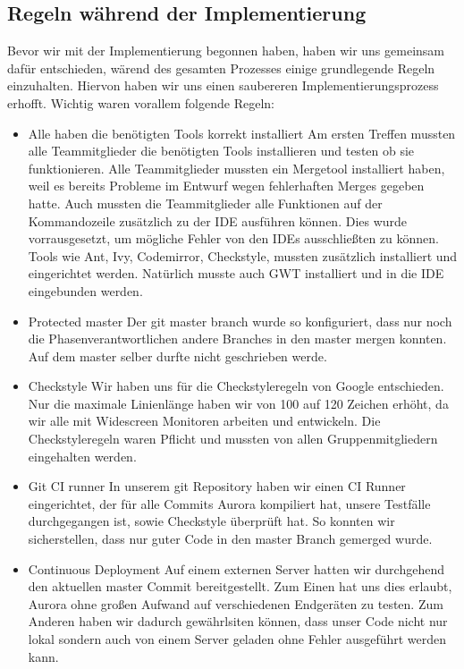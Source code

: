 \documentclass[parskip=full,11pt,twoside]{scrartcl}
\begin{document}
\subsection{Regeln während der Implementierung}
Bevor wir mit der Implementierung begonnen haben, haben wir uns gemeinsam dafür entschieden, wärend des gesamten Prozesses einige grundlegende Regeln einzuhalten.
Hiervon haben wir uns einen saubereren Implementierungsprozess erhofft.
Wichtig waren vorallem folgende Regeln:
\begin{itemize}
	\item Alle haben die benötigten Tools korrekt installiert
	\newline
	Am ersten Treffen mussten alle Teammitglieder die benötigten Tools installieren und testen ob sie funktionieren.
	Alle Teammitglieder mussten ein Mergetool installiert haben, weil es bereits Probleme im Entwurf wegen fehlerhaften Merges gegeben hatte.
	Auch mussten die Teammitglieder alle Funktionen auf der Kommandozeile zusätzlich 	zu der IDE ausführen können. Dies wurde vorrausgesetzt, um mögliche Fehler von den IDEs ausschließten zu können.
	Tools wie Ant, Ivy, Codemirror, Checkstyle, mussten zusätzlich installiert und eingerichtet werden.
	Natürlich musste auch GWT installiert und in die IDE eingebunden werden.

    \item Protected master
        \newline
        Der git master branch wurde so konfiguriert, dass nur noch die Phasenverantwortlichen andere Branches in den master mergen konnten.
        Auf dem master selber durfte nicht geschrieben werde.
    \item Checkstyle
    \newline
    Wir haben uns für die Checkstyleregeln von Google entschieden. Nur die maximale Linienlänge haben wir von 100 auf 120 Zeichen erhöht, da wir alle mit Widescreen Monitoren arbeiten und entwickeln. Die Checkstyleregeln waren Pflicht und mussten von allen Gruppenmitgliedern eingehalten werden.
    \item Git CI runner
        \newline
        In unserem git Repository haben wir einen CI Runner eingerichtet, der für alle Commits Aurora kompiliert hat, unsere Testfälle durchgegangen ist, sowie Checkstyle überprüft hat.
        So konnten wir sicherstellen, dass nur guter Code in den master Branch gemerged wurde.

    \item Continuous Deployment
        \newline
        Auf einem externen Server hatten wir durchgehend den aktuellen master Commit bereitgestellt.
        Zum Einen hat uns dies erlaubt, Aurora ohne großen Aufwand auf verschiedenen Endgeräten zu testen.
        Zum Anderen haben wir dadurch gewährlsiten können, dass unser Code nicht nur lokal sondern auch von einem Server geladen ohne Fehler ausgeführt werden kann.


\end{itemize}
\end{document}
